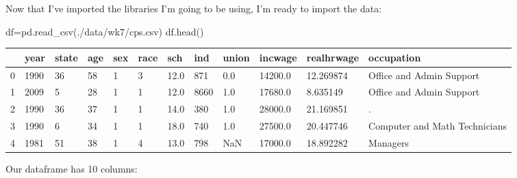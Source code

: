 \documentclass[
  letterpaper,
  DIV=11,
  numbers=noendperiod]{scrreprt}
\newenvironment{Shaded}{\begin{snugshade}}{\end{snugshade}}
\newcommand{\NormalTok}[1]{\textcolor[rgb]{0.00,0.23,0.31}{#1}}
\newcommand{\OperatorTok}[1]{\textcolor[rgb]{0.37,0.37,0.37}{#1}}
\newcommand{\StringTok}[1]{\textcolor[rgb]{0.13,0.47,0.30}{#1}}
\begin{document}
Now that I've imported the libraries I'm going to be using, I'm ready to
import the data:

\begin{Shaded}
\begin{Highlighting}[]
\NormalTok{df}\OperatorTok{=}\NormalTok{pd.read\_csv(}\StringTok{\textquotesingle{}./data/wk7/cps.csv\textquotesingle{}}\NormalTok{)}
\NormalTok{df.head()}
\end{Highlighting}
\end{Shaded}

\begin{longtable}[]{@{}llllllllllll@{}}
\toprule()
& year & state & age & sex & race & sch & ind & union & incwage &
realhrwage & occupation \\
\midrule()
\endhead
0 & 1990 & 36 & 58 & 1 & 3 & 12.0 & 871 & 0.0 & 14200.0 & 12.269874 &
Office and Admin Support \\
1 & 2009 & 5 & 28 & 1 & 1 & 12.0 & 8660 & 1.0 & 17680.0 & 8.635149 &
Office and Admin Support \\
2 & 1990 & 36 & 37 & 1 & 1 & 14.0 & 380 & 1.0 & 28000.0 & 21.169851 &
. \\
3 & 1990 & 6 & 34 & 1 & 1 & 18.0 & 740 & 1.0 & 27500.0 & 20.447746 &
Computer and Math Technicians \\
4 & 1981 & 51 & 38 & 1 & 4 & 13.0 & 798 & NaN & 17000.0 & 18.892282 &
Managers \\
\bottomrule()
\end{longtable}

Our dataframe has 10 columns:
\end{document}
